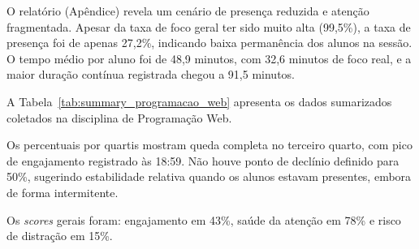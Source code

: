 O relatório (Apêndice) revela um cenário de presença reduzida e atenção fragmentada. Apesar da taxa de foco geral ter sido muito alta (99,5\%), a taxa de presença foi de apenas 27,2\%, indicando baixa permanência dos alunos na sessão. O tempo médio por aluno foi de 48,9 minutos, com 32,6 minutos de foco real, e a maior duração contínua registrada chegou a 91,5 minutos.

A Tabela~\ref{tab:summary_programacao_web} apresenta os dados sumarizados coletados na disciplina de Programação Web.



Os percentuais por quartis mostram queda completa no terceiro quarto, com pico de engajamento registrado às 18:59. Não houve ponto de declínio definido para 50\%, sugerindo estabilidade relativa quando os alunos estavam presentes, embora de forma intermitente.

Os \textit{scores} gerais foram: engajamento em 43\%, saúde da atenção em 78\% e risco de distração em 15\%.
